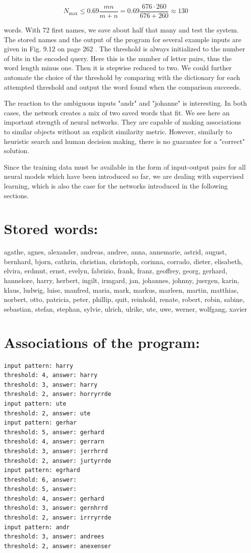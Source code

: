 \documentclass[10pt]{article}
\begin{document}
$$
N_{\max } \leq 0.69 \frac{m n}{m+n}=0.69 \frac{676 \cdot 260}{676+260} \approx 130
$$

words. With 72 first names, we save about half that many and test the system. The stored names and the output of the program for several example inputs are given in Fig. 9.12 on page 262 . The threshold is always initialized to the number of bits in the encoded query. Here this is the number of letter pairs, thus the word length minus one. Then it is stepwise reduced to two. We could further automate the choice of the threshold by comparing with the dictionary for each attempted threshold and output the word found when the comparison succeeds.

The reaction to the ambiguous inputs "andr" and "johanne" is interesting. In both cases, the network creates a mix of two saved words that fit. We see here an important strength of neural networks. They are capable of making associations to similar objects without an explicit similarity metric. However, similarly to heuristic search and human decision making, there is no guarantee for a "correct" solution.

Since the training data must be available in the form of input-output pairs for all neural models which have been introduced so far, we are dealing with supervised learning, which is also the case for the networks introduced in the following sections.

\section*{Stored words:}
agathe, agnes, alexander, andreas, andree, anna, annemarie, astrid, august, bernhard, bjorn, cathrin, christian, christoph, corinna, corrado, dieter, elisabeth, elvira, erdmut, ernst, evelyn, fabrizio, frank, franz, geoffrey, georg, gerhard, hannelore, harry, herbert, ingilt, irmgard, jan, johannes, johnny, juergen, karin, klaus, ludwig, luise, manfred, maria, mark, markus, marleen, martin, matthias, norbert, otto, patricia, peter, phillip, quit, reinhold, renate, robert, robin, sabine, sebastian, stefan, stephan, sylvie, ulrich, ulrike, ute, uwe, werner, wolfgang, xavier

\section*{Associations of the program:}
\begin{verbatim}
input pattern: harry
threshold: 4, answer: harry
threshold: 3, answer: harry
threshold: 2, answer: horryrrde
input pattern: ute
threshold: 2, answer: ute
input pattern: gerhar
threshold: 5, answer: gerhard
threshold: 4, answer: gerrarn
threshold: 3, answer: jerrhrrd
threshold: 2, answer: jurtyrrde
input pattern: egrhard
threshold: 6, answer:
threshold: 5, answer:
threshold: 4, answer: gerhard
threshold: 3, answer: gernhrrd
threshold: 2, answer: irrryrrde
input pattern: andr
threshold: 3, answer: andrees
threshold: 2, answer: anexenser
\end{verbatim}
\end{document}
